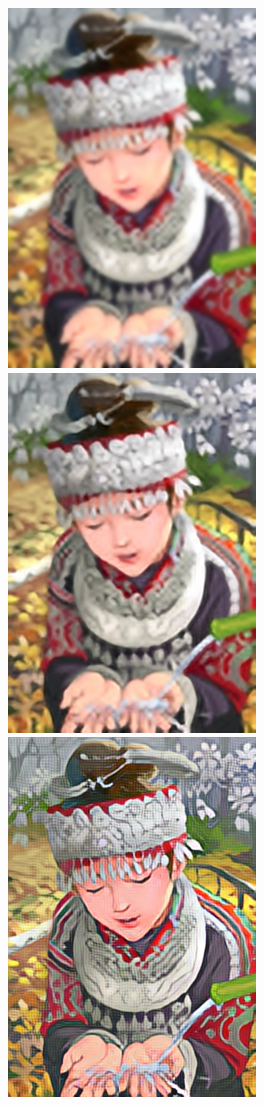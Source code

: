 \documentclass[runningheads]{llncs}
\begin{document}
\begin{figure}[t]
  \includegraphics[trim={30px 200px 50px 100px},clip,width=\mywidth]{set14_5_pixel.png}
  \includegraphics[trim={30px 200px 50px 100px},clip,width=\mywidth]{set14_5_srcnn.png}
  \includegraphics[trim={30px 200px 50px 100px},clip,width=\mywidth]{set14_5_feat.png}

\end{figure}
\end{document}
